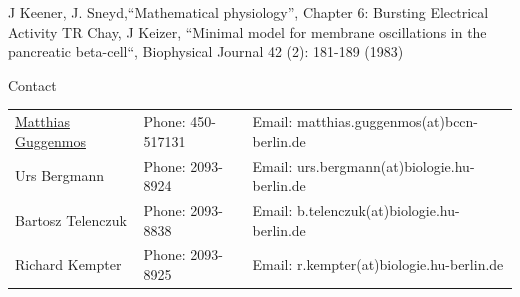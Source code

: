 \documentclass[12pt]{article}
\begin{document}
\begin{thebibliography}{7}
     J Keener, J. Sneyd,``Mathematical physiology'', Chapter 6: Bursting Electrical Activity
     TR Chay, J Keizer, ``Minimal model for membrane oscillations in the pancreatic beta-cell``, Biophysical Journal 42 (2): 181-189 (1983)
\end{thebibliography}

\vfill
\centerline{\CAP Contact}
\CAP

\begin{tabular}{lll}
\underline{Matthias Guggenmos} & Phone: 450-517131 & Email: matthias.guggenmos(at)bccn-berlin.de \\
Urs Bergmann & Phone: 2093-8924 & Email: urs.bergmann(at)biologie.hu-berlin.de \\
Bartosz Telenczuk & Phone: 2093-8838 & Email: b.telenczuk(at)biologie.hu-berlin.de \\
Richard Kempter & Phone: 2093-8925 & Email: r.kempter(at)biologie.hu-berlin.de \\
\end{tabular}
\end{document}
